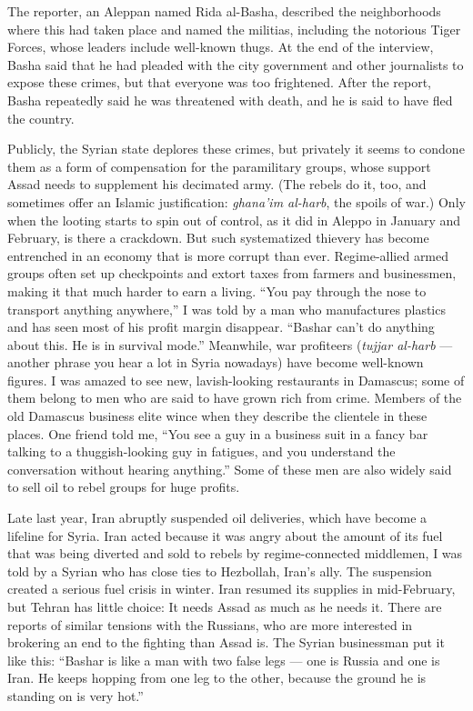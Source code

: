 The reporter, an Aleppan named Rida al-Basha, described the
neighborhoods where this had taken place and named the militias,
including the notorious Tiger Forces, whose leaders include well-known
thugs. At the end of the interview, Basha said that he had pleaded with
the city government and other journalists to expose these crimes, but
that everyone was too frightened. After the report, Basha repeatedly
said he was threatened with death, and he is said to have fled the
country.

Publicly, the Syrian state deplores these crimes, but privately it seems
to condone them as a form of compensation for the paramilitary groups,
whose support Assad needs to supplement his decimated army. (The rebels
do it, too, and sometimes offer an Islamic justification: \emph{ghana'im
al-harb}, the spoils of war.) Only when the looting starts to spin out
of control, as it did in Aleppo in January and February, is there a
crackdown. But such systematized thievery has become entrenched in an
economy that is more corrupt than ever. Regime-allied armed groups often
set up checkpoints and extort taxes from farmers and businessmen, making
it that much harder to earn a living. ``You pay through the nose to
transport anything anywhere,'' I was told by a man who manufactures
plastics and has seen most of his profit margin disappear. ``Bashar
can't do anything about this. He is in survival mode.'' Meanwhile, war
profiteers (\emph{tujjar al-harb} --- another phrase you hear a lot in
Syria nowadays) have become well-known figures. I was amazed to see new,
lavish-looking restaurants in Damascus; some of them belong to men who
are said to have grown rich from crime. Members of the old Damascus
business elite wince when they describe the clientele in these places.
One friend told me, ``You see a guy in a business suit in a fancy bar
talking to a thuggish-looking guy in fatigues, and you understand the
conversation without hearing anything.'' Some of these men are also
widely said to sell oil to rebel groups for huge profits.

Late last year, Iran abruptly suspended oil deliveries, which have
become a lifeline for Syria. Iran acted because it was angry about the
amount of its fuel that was being diverted and sold to rebels by
regime-connected middlemen, I was told by a Syrian who has close ties to
Hezbollah, Iran's ally. The suspension created a serious fuel crisis in
winter. Iran resumed its supplies in mid-February, but Tehran has little
choice: It needs Assad as much as he needs it. There are reports of
similar tensions with the Russians, who are more interested in brokering
an end to the fighting than Assad is. The Syrian businessman put it like
this: ``Bashar is like a man with two false legs --- one is Russia and
one is Iran. He keeps hopping from one leg to the other, because the
ground he is standing on is very hot.''

